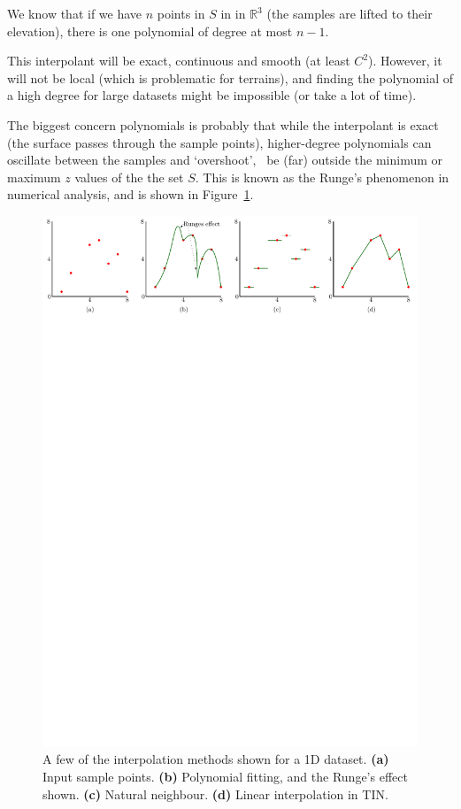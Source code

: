 We know that if we have $n$ points in $S$ in in $\mathbb{R}^3$ (the samples are lifted to their elevation), there is one polynomial of degree at most $n-1$.

This interpolant will be exact, continuous and smooth (at least $C^2$).
However, it will not be local (which is problematic for terrains), and finding the polynomial of a high degree for large datasets might be impossible (or take a lot of time).

The biggest concern polynomials is probably that while the interpolant is exact (the surface passes through the sample points), higher-degree polynomials can oscillate between the samples and `overshoot', \ie\ be (far) outside the minimum or maximum $z$ values of the the set $S$.
This is known as the Runge's phenomenon in numerical analysis, and is shown in Figure~\ref{fig:polynomial}.
\begin{figure}
  \centering
  \includegraphics[width=\linewidth]{figs/polynomial}
  \caption{A few of the interpolation methods shown for a 1D dataset. \textbf{(a)} Input sample points. \textbf{(b)} Polynomial fitting, and the Runge's effect shown. \textbf{(c)} Natural neighbour. \textbf{(d)} Linear interpolation in TIN.}
\label{fig:polynomial}
\end{figure}



